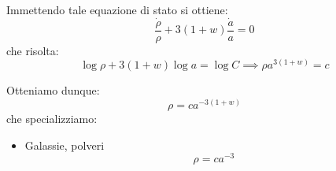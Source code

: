 Immettendo tale equazione di stato si ottiene:
\begin{equation*}
    \frac{\dot{\rho}}{\rho} + 3(1+w)\frac{\dot{a}}{a} = 0
\end{equation*}
che risolta:
\begin{equation*}
    \log \rho +3(1+w)\log a = \log C \implies \rho a^{3(1+w)} = c
\end{equation*}

Otteniamo dunque:
\begin{equation}
    \rho = ca^{-3(1+w)}
    \label{eq.evoluzione_densità_massa}
\end{equation}
che specializziamo:
\begin{itemize}
    \item Galassie, polveri
    \begin{equation*}
        \rho = c a^{-3}
    \end{equation*}
    

\end{itemize}
